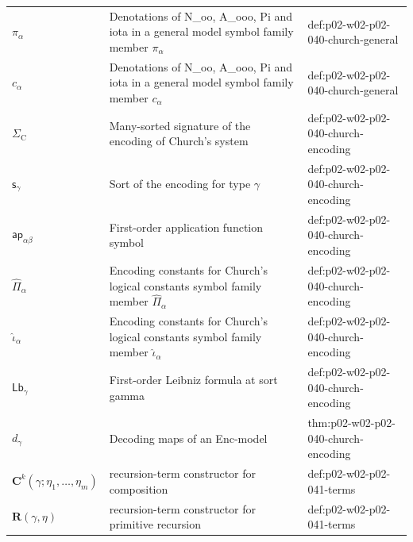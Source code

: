 \begin{longtable}{@{}p{}p{}p{}@{}}
\(\pi_\alpha\) & Denotations of N\_oo, A\_ooo, Pi and iota in a general model symbol family member \(\pi_\alpha\) & def:\allowbreak{}p02-\allowbreak{}w02-\allowbreak{}p02-\allowbreak{}040-\allowbreak{}church-\allowbreak{}general \\
\(c_\alpha\) & Denotations of N\_oo, A\_ooo, Pi and iota in a general model symbol family member \(c_\alpha\) & def:\allowbreak{}p02-\allowbreak{}w02-\allowbreak{}p02-\allowbreak{}040-\allowbreak{}church-\allowbreak{}general \\
\(\Sigma_{\mathrm C}\) & Many-sorted signature of the encoding of Church's system & def:\allowbreak{}p02-\allowbreak{}w02-\allowbreak{}p02-\allowbreak{}040-\allowbreak{}church-\allowbreak{}encoding \\
\(\mathsf s_\gamma\) & Sort of the encoding for type \(\gamma\) & def:\allowbreak{}p02-\allowbreak{}w02-\allowbreak{}p02-\allowbreak{}040-\allowbreak{}church-\allowbreak{}encoding \\
\(\mathsf{ap}_{\alpha\beta}\) & First-order application function symbol & def:\allowbreak{}p02-\allowbreak{}w02-\allowbreak{}p02-\allowbreak{}040-\allowbreak{}church-\allowbreak{}encoding \\
\(\widehat\Pi_\alpha\) & Encoding constants for Church's logical constants symbol family member \(\widehat\Pi_\alpha\) & def:\allowbreak{}p02-\allowbreak{}w02-\allowbreak{}p02-\allowbreak{}040-\allowbreak{}church-\allowbreak{}encoding \\
\(\widehat\iota_\alpha\) & Encoding constants for Church's logical constants symbol family member \(\widehat\iota_\alpha\) & def:\allowbreak{}p02-\allowbreak{}w02-\allowbreak{}p02-\allowbreak{}040-\allowbreak{}church-\allowbreak{}encoding \\
\(\mathsf{Lb}_\gamma\) & First-order Leibniz formula at sort gamma & def:\allowbreak{}p02-\allowbreak{}w02-\allowbreak{}p02-\allowbreak{}040-\allowbreak{}church-\allowbreak{}encoding \\
\(d_\gamma\) & Decoding maps of an Enc-model & thm:\allowbreak{}p02-\allowbreak{}w02-\allowbreak{}p02-\allowbreak{}040-\allowbreak{}church-\allowbreak{}encoding \\
\(\mathbf C^k(\gamma;\allowbreak \eta_1,\allowbreak \ldots,\allowbreak \eta_m)\) & recursion-term constructor for composition & def:\allowbreak{}p02-\allowbreak{}w02-\allowbreak{}p02-\allowbreak{}041-\allowbreak{}terms \\
\(\mathbf R(\gamma,\allowbreak \eta)\) & recursion-term constructor for primitive recursion & def:\allowbreak{}p02-\allowbreak{}w02-\allowbreak{}p02-\allowbreak{}041-\allowbreak{}terms \\

\end{longtable}
